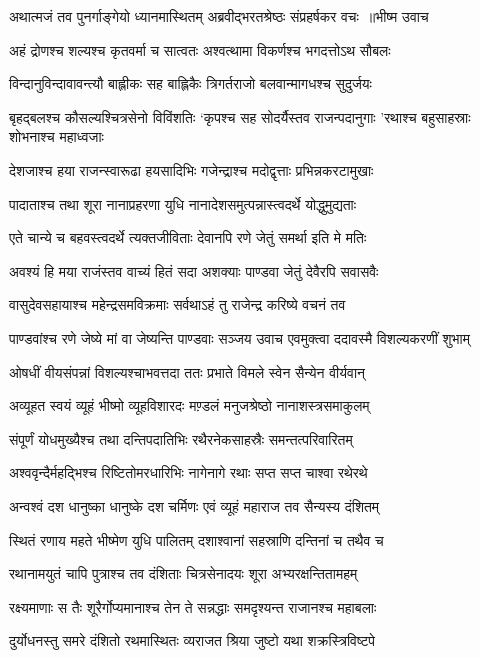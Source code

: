 \threelineshloka
{अथात्मजं तव पुनर्गाङ्गेयो ध्यानमास्थितम्}
{अब्रवीद्भरतश्रेष्ठः संप्रहर्षकर वचः ॥भीष्म उवाच}
{}


\twolineshloka
{अहं द्रोणश्च शल्यश्च कृतवर्मा च सात्वतः}
{अश्वत्थामा विकर्णश्च भगदत्तोऽथ सौबलः}


\twolineshloka
{विन्दानुविन्दावावन्त्यौ बाह्लीकः सह बाह्लिकैः}
{त्रिगर्तराजो बलवान्मागधश्च सुदुर्जयः}


\threelineshloka
{बृहद्बलश्च कौसल्यश्चित्रसेनो विविंशतिः}
{`कृपश्च सह सोदर्यैस्तव राजन्पदानुगाः}
{'रथाश्च बहुसाहस्राः शोभनाश्च महाध्वजाः}


\twolineshloka
{देशजाश्च हया राजन्स्वारूढा हयसादिभिः}
{गजेन्द्राश्च मदोद्वृत्ताः प्रभिन्नकरटामुखाः}


\twolineshloka
{पादाताश्च तथा शूरा नानाप्रहरणा युधि}
{नानादेशसमुत्पन्नास्त्वदर्थे योद्धुमुद्यताः}


\twolineshloka
{एते चान्ये च बहवस्त्वदर्थे त्यक्तजीविताः}
{देवानपि रणे जेतुं समर्था इति मे मतिः}


\twolineshloka
{अवश्यं हि मया राजंस्तव वाच्यं हितं सदा}
{अशक्याः पाण्डवा जेतुं देवैरपि सवासवैः}


\twolineshloka
{वासुदेवसहायाश्च महेन्द्रसमविक्रमाः}
{सर्वथाऽहं तु राजेन्द्र करिष्ये वचनं तव}


\threelineshloka
{पाण्डवांश्च रणे जेष्ये मां वा जेष्यन्ति पाण्डवाः}
{सञ्जय उवाच}
{एवमुक्त्वा ददावस्मै विशल्यकरणीं शुभाम्}


\twolineshloka
{ओषधीं वीयसंपन्नां विशल्यश्चाभवत्तदा}
{ततः प्रभाते विमले स्वेन सैन्येन वीर्यवान्}


\twolineshloka
{अव्यूहत स्वयं व्यूहं भीष्मो व्यूहविशारदः}
{मण़्डलं मनुजश्रेष्ठो नानाशस्त्रसमाकुलम्}


\twolineshloka
{संपूर्णं योधमुख्यैश्च तथा दन्तिपदातिभिः}
{रथैरनेकसाहस्रैः समन्तत्परिवारितम्}


\twolineshloka
{अश्ववृन्दैर्महद्भिश्च रिष्टितोमरधारिभिः}
{नागेनागे रथाः सप्त सप्त चाश्वा रथेरथे}


\twolineshloka
{अन्वश्वं दश धानुष्का धानुष्के दश चर्मिणः}
{एवं व्यूहं महाराज तव सैन्यस्य दंशितम्}


\twolineshloka
{स्थितं रणाय महते भीष्मेण युधि पालितम्}
{दशाश्वानां सहस्राणि दन्तिनां च तथैव च}


\twolineshloka
{रथानामयुतं चापि पुत्राश्च तव दंशिताः}
{चित्रसेनादयः शूरा अभ्यरक्षन्तितामहम्}


\twolineshloka
{रक्ष्यमाणाः स तैः शूरैर्गोप्यमानाश्च तेन ते}
{सन्नद्धाः समदृश्यन्त राजानश्च महाबलाः}


\twolineshloka
{दुर्योधनस्तु समरे दंशितो रथमास्थितः}
{व्यराजत श्रिया जुष्टो यथा शक्रस्त्रिविष्टपे}


